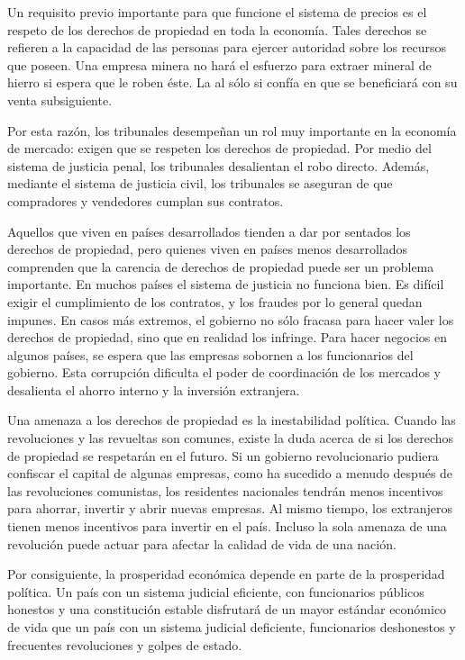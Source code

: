 \documentclass[
]{krantz}
\begin{document}
Un requisito previo importante para que funcione el sistema de precios es el respeto de los derechos de propiedad en toda la economía. Tales derechos se refieren a la capacidad de las personas para ejercer autoridad sobre los recursos que poseen. Una empresa minera no hará el esfuerzo para extraer mineral de hierro si espera que le roben éste. La al sólo si confía en que se beneficiará con su venta subsiguiente.

Por esta razón, los tribunales desempeñan un rol muy importante en la economía de mercado: exigen que se respeten los derechos de propiedad. Por medio del sistema de justicia penal, los tribunales desalientan el robo directo. Además, mediante el sistema de justicia civil, los tribunales se aseguran de que compradores y vendedores cumplan sus contratos.

Aquellos que viven en países desarrollados tienden a dar por sentados los derechos de propiedad, pero quienes viven en países menos desarrollados comprenden que la carencia de derechos de propiedad puede ser un problema importante. En muchos países el sistema de justicia no funciona bien. Es difícil exigir el cumplimiento de los contratos, y los fraudes por lo general quedan impunes. En casos más extremos, el gobierno no sólo fracasa para hacer valer los derechos de propiedad, sino que en realidad los infringe. Para hacer negocios en algunos países, se espera que las empresas sobornen a los funcionarios del gobierno. Esta corrupción dificulta el poder de coordinación de los mercados y desalienta el ahorro interno y la inversión extranjera.

Una amenaza a los derechos de propiedad es la inestabilidad política. Cuando las revoluciones y las revueltas son comunes, existe la duda acerca de si los derechos de propiedad se respetarán en el futuro. Si un gobierno revolucionario pudiera confiscar el capital de algunas empresas, como ha sucedido a menudo después de las revoluciones comunistas, los residentes nacionales tendrán menos incentivos para ahorrar, invertir y abrir nuevas empresas. Al mismo tiempo, los extranjeros tienen menos incentivos para invertir en el país. Incluso la sola amenaza de una revolución puede actuar para afectar la calidad de vida de una nación.

Por consiguiente, la prosperidad económica depende en parte de la prosperidad política. Un país con un sistema judicial eficiente, con funcionarios públicos honestos y una constitución estable disfrutará de un mayor estándar económico de vida que un país con un sistema judicial deficiente, funcionarios deshonestos y frecuentes revoluciones y golpes de estado.
\end{document}
